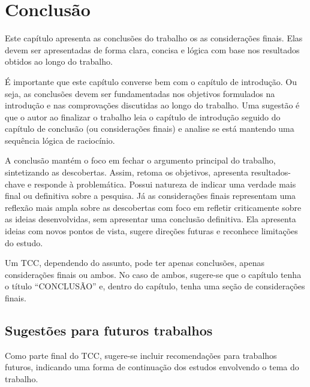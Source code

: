 \chapter{Conclusão}

Este capítulo apresenta as conclusões do trabalho os as considerações finais.
Elas devem ser apresentadas de forma clara, concisa e lógica com base nos resultados obtidos ao longo do trabalho. 

É importante que este capítulo converse bem com o capítulo de introdução.
Ou seja, as conclusões devem ser fundamentadas nos objetivos formulados na introdução e nas comprovações discutidas ao longo do trabalho.
Uma sugestão é que o autor ao finalizar o trabalho leia o capítulo de introdução seguido do capítulo de conclusão (ou considerações finais) e analise se está mantendo uma sequência lógica de raciocínio.

A conclusão mantém o foco em fechar o argumento principal do trabalho, sintetizando as descobertas. 
Assim, retoma os objetivos, apresenta resultados-chave e responde à problemática.
Possui natureza de indicar uma verdade mais final ou definitiva sobre a pesquisa.
Já as considerações finais representam uma reflexão mais ampla sobre as descobertas com foco em refletir criticamente sobre as ideias desenvolvidas, sem apresentar uma conclusão definitiva.
Ela apresenta ideias com novos pontos de vista, sugere direções futuras e reconhece limitações do estudo.

Um TCC, dependendo do assunto, pode ter apenas conclusões, apenas considerações finais ou ambos.
No caso de ambos, sugere-se que o capítulo tenha o título ``CONCLUSÃO'' e, dentro do capítulo, tenha uma seção de considerações finais.

\section{Sugestões para futuros trabalhos}

Como parte final do TCC, sugere-se incluir recomendações para trabalhos futuros, indicando uma forma de continuação dos estudos envolvendo o tema do trabalho.